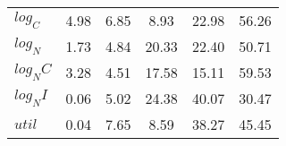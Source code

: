 \begin{center}
\begin{longtable}{lccccc}
$log_C         $	 & 	        4.98	 & 	        6.85	 & 	        8.93	 & 	       22.98	 & 	       56.26 \\ 
$log_N         $	 & 	        1.73	 & 	        4.84	 & 	       20.33	 & 	       22.40	 & 	       50.71 \\ 
$log_NC        $	 & 	        3.28	 & 	        4.51	 & 	       17.58	 & 	       15.11	 & 	       59.53 \\ 
$log_NI        $	 & 	        0.06	 & 	        5.02	 & 	       24.38	 & 	       40.07	 & 	       30.47 \\ 
$util          $	 & 	        0.04	 & 	        7.65	 & 	        8.59	 & 	       38.27	 & 	       45.45 \\ 
\end{longtable}
 \end{center}
